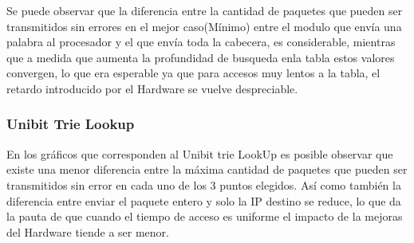 Se puede observar que la diferencia entre la cantidad de paquetes que pueden ser transmitidos sin errores en el mejor caso(Mínimo) entre el modulo que envía una palabra al procesador y el que envía toda la cabecera, es considerable, mientras que a medida que aumenta la profundidad de busqueda enla tabla estos valores convergen, lo que era esperable ya que para accesos muy lentos a la tabla, el retardo introducido por el Hardware se vuelve despreciable.

\newpage
\subsubsection{Unibit Trie Lookup}

En los gráficos que corresponden al Unibit trie LookUp es posible observar que existe una menor diferencia entre la máxima cantidad de paquetes que pueden ser transmitidos sin error en cada uno de los 3 puntos elegidos. Así como también la diferencia entre enviar el paquete entero y solo la IP destino se reduce, lo que da la pauta de que cuando el tiempo de acceso es uniforme el impacto de la mejoras del Hardware tiende a ser menor.

